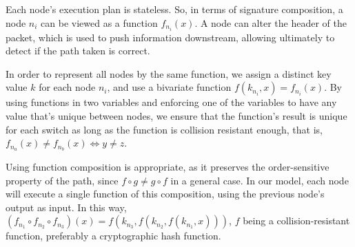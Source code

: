 Each node's execution plan is stateless. So, in terms of signature composition, a node $n_i$ can be viewed as a function $f_{n_i} (x)$. A node can alter the header of the packet, which
is used to push information downstream,
allowing ultimately to detect if the path taken is correct.

In order to represent all nodes by the same function, we assign a distinct key value $k$ for each node $n_i$, and use a bivariate function $f(k_{n_i}, x) = f_{n_i} (x)$.
By using functions in two variables and enforcing one of the variables to have any value that's unique between nodes, we ensure that the function's result is unique for each switch as long as the function is collision resistant enough, that is, $f_{n_a} (x) \neq f_{n_b} (x) \iff y \neq z$.

Using function composition is appropriate, as it preserves the order-sensitive property of the path, since $f \circ g \neq g \circ f$ in a general case.
In our model, each node will execute a single function of this composition, using the previous node's output as input.
In this way, $ (f_{n_1} \circ f_{n_2} \circ f_{n_3})(x) = f(k_{n_3}, f(k_{n_2}, f(k_{n_1}, x))) $, $f$ being a collision-resistant function, preferably a cryptographic hash function.
